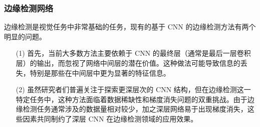 \documentclass[a4paper]{ctexart}
\begin{document}
%	
%	
	
	\subsubsection{边缘检测网络}
	
	边缘检测是视觉任务中非常基础的任务，现有的基于 CNN 的边缘检测方法有两个明显的问题。
	
	\begin{itemize}
		\item [(1)] 首先，当前大多数方法主要依赖于 CNN 的最终层（通常是最后一层卷积层）的输出，而忽视了网络中间层的潜在价值。这种做法可能导致信息的丢失，特别是那些在中间层中更为显著的特征信息。
		
		\item [(2)] 虽然研究者们普遍关注于探索更深层次的 CNN 结构，但在边缘检测这一特定任务中，这种方法面临着数据稀缺性和梯度消失问题的双重挑战。由于边缘检测任务通常涉及的数据量相对较少，加之深层网络易于出现梯度消失，这些因素共同制约了深层 CNN 在边缘检测领域的应用效果。
	\end{itemize}
	
\end{document}
